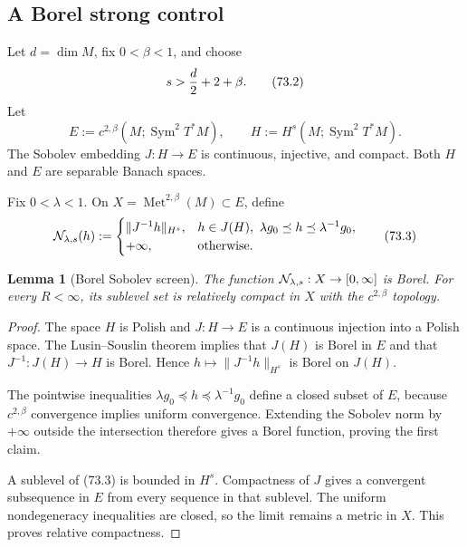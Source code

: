 \documentclass[11pt]{article}
\newtheorem{lemma}[theorem]{Lemma}
\theoremstyle{remark}
\begin{document}
\subsection{A Borel strong control}

Let \(d=\dim M\), fix \(0<\beta<1\), and choose
\begin{equation}
                         s>{d\over2}+2+\beta.                 \tag{73.2}
\end{equation}
Let
\[
 E:=c^{2,\beta}(M;\operatorname{Sym}^2T^*M),\qquad
 H:=H^s(M;\operatorname{Sym}^2T^*M).
\]
The Sobolev embedding \(J:H\to E\) is continuous, injective, and
compact.  Both \(H\) and \(E\) are separable Banach spaces.

Fix \(0<\lambda<1\).  On
\(X=\operatorname{Met}^{2,\beta}(M)\subset E\), define
\begin{equation}
 {\cal N}_{\lambda,s}(h)
 :=
 \begin{cases}
  \|J^{-1}h\|_{H^s},&
  h\in J(H),\
  \lambda g_0\preceq h\preceq\lambda^{-1}g_0,\\
  +\infty,&\text{otherwise}.
 \end{cases}                                                \tag{73.3}
\end{equation}

\begin{lemma}[Borel Sobolev screen]
\label{lem:v12v73-Borel-screen}
The function \({\cal N}_{\lambda,s}:X\to[0,\infty]\) is Borel.
For every \(R<\infty\), its sublevel set is relatively compact in
\(X\) with the \(c^{2,\beta}\) topology.
\end{lemma}

\begin{proof}
The space \(H\) is Polish and \(J:H\to E\) is a continuous
injection into a Polish space.  The Lusin--Souslin theorem implies
that \(J(H)\) is Borel in \(E\) and that
\(J^{-1}:J(H)\to H\) is Borel.  Hence
\(h\mapsto\|J^{-1}h\|_{H^s}\) is Borel on \(J(H)\).

The pointwise inequalities
\(\lambda g_0\preceq h\preceq\lambda^{-1}g_0\) define a closed
subset of \(E\), because \(c^{2,\beta}\) convergence implies uniform
convergence.  Extending the Sobolev norm by \(+\infty\) outside the
intersection therefore gives a Borel function, proving the first
claim.

A sublevel of (73.3) is bounded in \(H^s\).  Compactness of \(J\)
gives a convergent subsequence in \(E\) from every sequence in that
sublevel.  The uniform nondegeneracy inequalities are closed, so the
limit remains a metric in \(X\).  This proves relative compactness.
\end{proof}
\end{document}
